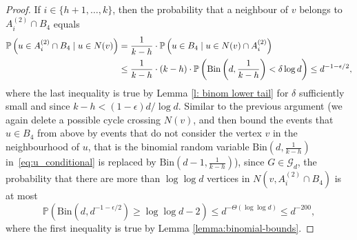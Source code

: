 \documentclass[notitlepage]{scrartcl}
\renewcommand{\Pr}{\mathbb{P}}
\begin{document}
\begin{proof}
    If $i \in \{h+1,\ldots,k\}$, then the probability that a neighbour of $v$ belongs to $A_i^{(2)} \cap B_4$ equals
    \begin{align}
        \Pr\left(u \in A_i^{(2)} \cap B_4 \mid u \in N(v)\right) &= \frac{1}{k - h} \cdot \Pr\left(u \in B_4 \mid u \in N(v) \cap A_i^{(2)}\right)\notag \\
        &\le \frac{1}{k - h} \cdot (k-h) \cdot \Pr\left(\text{Bin}\left(d, \frac{1}{k - h}\right) < \delta \log d\right) \le d^{-1 - \epsilon/2},   
    \label{eq:u_conditional}
    \end{align}
    where the last inequality is true by Lemma \ref{l: binom lower tail} for $\delta$ sufficiently small and since $k-h< (1-\epsilon)d/\log d$. Similar to the previous argument (we again delete a possible cycle crossing $N(v)$, and then bound the events that $u\in B_4$ from above by events that do not consider the vertex $v$ in the neighbourhood of $u$, that is the binomial random variable $\text{Bin}\left(d, \frac{1}{k - h}\right)$ in~\eqref{eq:u_conditional} is replaced by $\text{Bin}\left(d-1, \frac{1}{k - h}\right)$), since $G \in \mathcal{G}_d$, the probability that there are more than $\log \log d$ vertices in $N(v, A_i^{(2)} \cap B_4)$ is at most
    \[
        \Pr\left(\text{Bin}\left(d, d^{-1 - \epsilon/2}\right) \ge \log \log d - 2\right) \le d^{-\Theta(\log \log d)} \le d^{-200},
    \]
    where the first inequality is true by Lemma \ref{lemma:binomial-bounds}. 
\end{proof}
\end{document}

